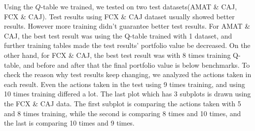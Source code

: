 Using the $Q$-table we trained, we tested on two test datasets(AMAT \& CAJ, FCX \& CAJ). Test results using FCX \& CAJ dataset usually showed better results. However more training didn’t guarantee better test results. For AMAT \& CAJ, the best test result was using the Q-table trained with 1 dataset, and further training tables made the test results’ portfolio value be decreased. On the other hand, for FCX \& CAJ, the best test result was with 8 times training Q-table, and before and after that the final portfolio value is below benchmarks. To check the reason why test results keep changing, we analyzed the actions taken in each result. Even the actions taken in the test using 9 times training, and using 10 times training differed a lot. The last plot which has 3 subplots is drawn using the FCX \& CAJ data. The first subplot is comparing the actions taken with 5 and 8 times training, while the second is comparing 8 times and 10 times, and the last is comparing 10 times and 9 times.
\vspace{0.05cm}
